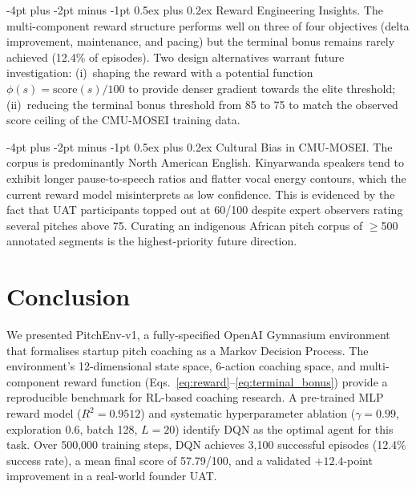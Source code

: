 \documentclass{article}
\makeatletter
\renewcommand\paragraph{\@startsection{paragraph}{4}{\z@}%
  {-4pt plus -2pt minus -1pt}%
  {0.5ex plus 0.2ex}%
  {\normalsize\bf}}
\makeatother
\begin{document}
\paragraph{Reward Engineering Insights.}
The multi-component reward structure performs well on three of four
objectives (delta improvement, maintenance, and pacing) but the terminal
bonus remains rarely achieved (12.4\% of episodes).
Two design alternatives warrant future investigation:
(i)~shaping the reward with a potential function
$\phi(s) = \text{score}(s) / 100$ to provide denser gradient towards
the elite threshold; (ii)~reducing the terminal bonus threshold from 85
to 75 to match the observed score ceiling of the CMU-MOSEI training data.

\paragraph{Cultural Bias in CMU-MOSEI.}
The corpus is predominantly North American English.
Kinyarwanda speakers tend to exhibit longer pause-to-speech ratios and
flatter vocal energy contours, which the current reward model misinterprets
as low confidence.
This is evidenced by the fact that UAT participants topped out at 60/100
despite expert observers rating several pitches above 75.
Curating an indigenous African pitch corpus of $\geq$500 annotated segments
is the highest-priority future direction.


\FloatBarrier
\section{Conclusion}

We presented PitchEnv-v1, a fully-specified OpenAI Gymnasium environment
that formalises startup pitch coaching as a Markov Decision Process.
The environment's 12-dimensional state space, 6-action coaching space,
and multi-component reward function (Eqs.~\ref{eq:reward}--\ref{eq:terminal_bonus})
provide a reproducible benchmark for RL-based coaching research.
A pre-trained MLP reward model ($R^2 = 0.9512$) and systematic
hyperparameter ablation ($\gamma = 0.99$, exploration 0.6, batch 128,
$L = 20$) identify DQN as the optimal agent for this task.
Over 500{,}000 training steps, DQN achieves 3{,}100 successful episodes
(12.4\% success rate), a mean final score of 57.79/100, and a validated
$+12.4$-point improvement in a real-world founder UAT.
\end{document}
